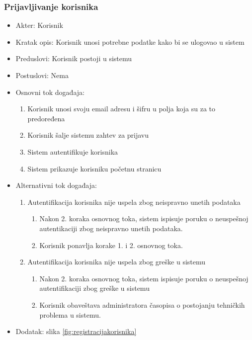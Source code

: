 \documentclass[a4paper]{article}
\begin{document}
\subsubsection{Prijavljivanje korisnika}
\label{subsubsection:prijavljivanjekorisnika}
\begin{itemize}
    \item Akter: Korisnik
    \item Kratak opis: Korisnik unosi potrebne podatke kako bi se ulogovao u sistem
    \item Preduslovi: Korisnik postoji u sistemu
    \item Postuslovi: Nema
    \item Osnovni tok događaja:
        \begin{enumerate}
            \item Korisnik unosi svoju email adresu i šifru u polja koja su za to predoređena
            \item Korisnik šalje sistemu zahtev za prijavu
            \item Sistem autentifikuje korisnika
            \item Sistem prikazuje korisniku početnu stranicu
        \end{enumerate}
    \item Alternativni tok događaja:
        \begin{enumerate}
            \item Autentifikacija korisnika nije uspela zbog neispravno unetih podataka
                \begin{enumerate}
                    \item Nakon 2. koraka osnovnog toka, sistem ispisuje poruku o neuspešnoj autentikaciji zbog neispravno unetih podataka.
                    \item Korisnik ponavlja korake 1. i 2. osnovnog toka.
                \end{enumerate}
            \item Autentifikacija korisnika nije uspela zbog greške u sistemu
                \begin{enumerate}
                    \item Nakon 2. koraka osnovnog toka, sistem ispisuje poruku o neuspešnoj autentifikaciji zbog greške u sistemu
                    \item Korisnik obaveštava administratora časopisa o postojanju tehničkih problema u sistemu.
                \end{enumerate}
        \end{enumerate}
        \item Dodatak: slika \ref{fig:registracijakorisnika}
\end{itemize}
\end{document}
